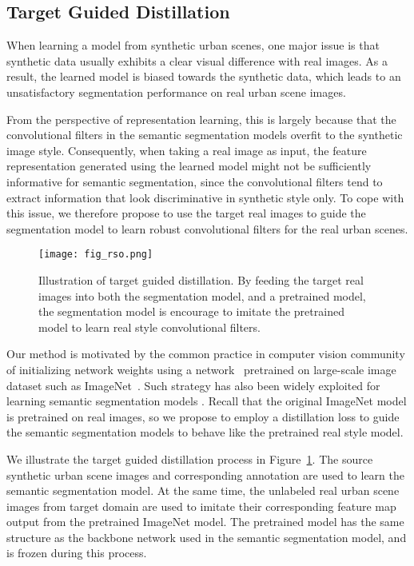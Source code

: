 \documentclass[10pt,twocolumn,letterpaper]{article}
\begin{document}
\subsection{Target Guided Distillation}
\label{sec:rso}
When learning a model from synthetic urban scenes, one major issue is that synthetic data usually exhibits a clear visual difference with real images. As a result, the learned model is biased towards the synthetic data, which leads to an unsatisfactory segmentation performance on real urban scene images. 

From the perspective of representation learning, this is largely because that the convolutional filters in the semantic segmentation models overfit to the synthetic image style. Consequently, when taking a real image as input, the feature representation generated using the learned model might not be sufficiently informative for semantic segmentation, since the convolutional filters tend to extract information that look discriminative in synthetic style only. To cope with this issue, we therefore propose to use the target real images to guide the segmentation model to learn robust convolutional filters for the real urban scenes. 

\begin{figure}
\centering
\texttt{[image: fig\_rso.png]}
\caption{Illustration of target guided distillation. By feeding the target real images into both the segmentation model, and a pretrained model, the segmentation model is encourage to imitate the pretrained model to learn real style convolutional filters.}
\label{fig:fig_rso}
\end{figure}

Our method is motivated by the common practice in computer vision community of initializing network weights using a network~\cite{he2016deep,simonyan2014very} pretrained on large-scale image dataset such as ImageNet~\cite{imagenet_cvpr09}. Such strategy has also been widely exploited for learning semantic segmentation models \cite{chen2016deeplab,yu2015multi,zhao2016pyramid}. Recall that the original ImageNet model is pretrained on real images, so we propose to employ a distillation loss to guide the semantic segmentation models to behave like the pretrained real style model. 

We illustrate the target guided distillation process in Figure~\ref{fig:fig_rso}. The source synthetic urban scene images and corresponding annotation are used to learn the semantic segmentation model. At the same time, the unlabeled real urban scene images from target domain are used to imitate their corresponding feature map output from the pretrained ImageNet model. The pretrained model has the same structure as the backbone network used in the semantic segmentation model, and is frozen during this process. 
\end{document}
